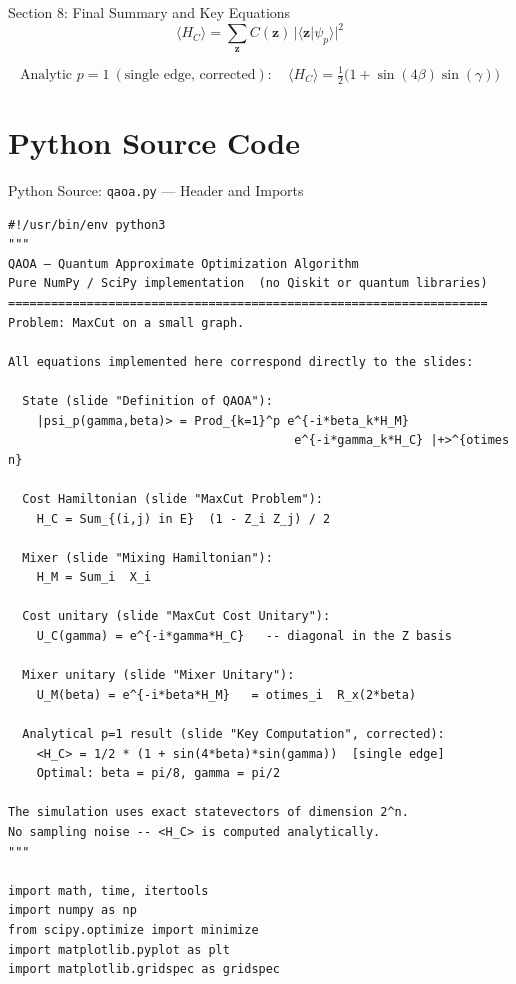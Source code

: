 \documentclass{beamer}
\begin{document}
\begin{frame}
\begin{frame}{Section 8: Final Summary and Key Equations}
\[
  \langle H_C\rangle = \sum_{\mathbf{z}} C(\mathbf{z})\,|\langle\mathbf{z}|\psi_p\rangle|^2
\]

\[
  \text{Analytic } p=1\ (\text{single edge, corrected}):
  \quad \langle H_C\rangle = \tfrac{1}{2}\bigl(1 + \sin(4\beta)\sin(\gamma)\bigr)
\]
\end{frame}

\section{Python Source Code}

\begin{frame}{Python Source: \texttt{qaoa.py} --- Header and Imports}
\footnotesize
\begin{verbatim}
#!/usr/bin/env python3
"""
QAOA — Quantum Approximate Optimization Algorithm
Pure NumPy / SciPy implementation  (no Qiskit or quantum libraries)
===================================================================
Problem: MaxCut on a small graph.

All equations implemented here correspond directly to the slides:

  State (slide "Definition of QAOA"):
    |psi_p(gamma,beta)> = Prod_{k=1}^p e^{-i*beta_k*H_M}
                                        e^{-i*gamma_k*H_C} |+>^{otimes n}

  Cost Hamiltonian (slide "MaxCut Problem"):
    H_C = Sum_{(i,j) in E}  (1 - Z_i Z_j) / 2

  Mixer (slide "Mixing Hamiltonian"):
    H_M = Sum_i  X_i

  Cost unitary (slide "MaxCut Cost Unitary"):
    U_C(gamma) = e^{-i*gamma*H_C}   -- diagonal in the Z basis

  Mixer unitary (slide "Mixer Unitary"):
    U_M(beta) = e^{-i*beta*H_M}   = otimes_i  R_x(2*beta)

  Analytical p=1 result (slide "Key Computation", corrected):
    <H_C> = 1/2 * (1 + sin(4*beta)*sin(gamma))  [single edge]
    Optimal: beta = pi/8, gamma = pi/2

The simulation uses exact statevectors of dimension 2^n.
No sampling noise -- <H_C> is computed analytically.
"""

import math, time, itertools
import numpy as np
from scipy.optimize import minimize
import matplotlib.pyplot as plt
import matplotlib.gridspec as gridspec


\end{verbatim}
\end{frame}
\end{frame}
\end{document}
